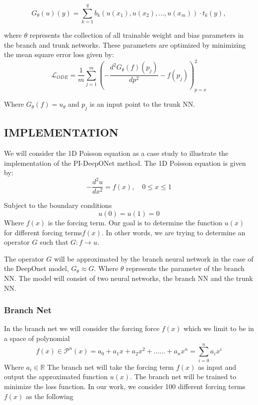 \documentclass[a4paper, onecolumn, 12pt]{article}
\begin{document}
\begin{equation}
G_{\theta}(u)(y) = \sum_{k=1}^{q} b_k(u(x_1), u(x_2), ..., u(x_m)) \cdot t_k(y),
\end{equation}

where $\theta$ represents the collection of all trainable weight and bias parameters in the branch and trunk networks. 
These parameters are optimized by minimizing the mean square error loss given by:
$$
\mathcal{L}_{ODE} = \frac{1}{m} \sum_{j=1}^{m}
\left(
-\frac{d^2 G_{\theta}(f)(p_j)}{dp^2} - f(p_j)
\right)^2_{p=x}
$$

Where $G_{\theta}(f)=u_{\theta}$ and $p_j$ is an input point to the trunk NN.
\subsection{IMPLEMENTATION}
We will consider the 1D Poisson equation as a case study to 
illustrate the im\-ple\-men\-ta\-tion of the PI-DeepONet method. The 1D Poisson equation is given by:
$$
-\frac{d^2 u}{d x^2} = f(x), \quad 0 \le x \le 1
$$

Subject to the boundary conditions
$$
u(0) = u(1) = 0
$$
Where $f(x)$ is the forcing term. Our goal is to determine the function $u(x)$ for different
 forcing terms$f(x)$. In other words, we are trying to determine an
  operator $G$ such that $G:f \rightarrow u$.

The operator $G$ will be approximated by the branch neural network in the case of
 the DeepOnet model, $G_{\theta} \approx G$. Where $\theta$ represents the parameter 
 of the branch NN.
The model will consist of two neural networks, the branch NN and the trunk NN. 

\subsubsection{Branch Net}
In the branch net we will consider the forcing force $f(x)$ which we limit to be in a space of polynomial
$$f(x) \in \mathcal{P}^n(x) =   a_0 + a_1 x + a_2 x^2 + \dots \dots + a_n x^n = \sum_{i=0}^{n} a_i x^i$$ 
Where $a_i \in \mathbb{R}$ The branch net will take the forcing term $f(x)$ as input and output the approximated function $u(x)$.
The branch net will be trained to minimize the loss function. In our work, we consider 100 different forcing terms $f(x)$ as the following 
  
\end{document}
